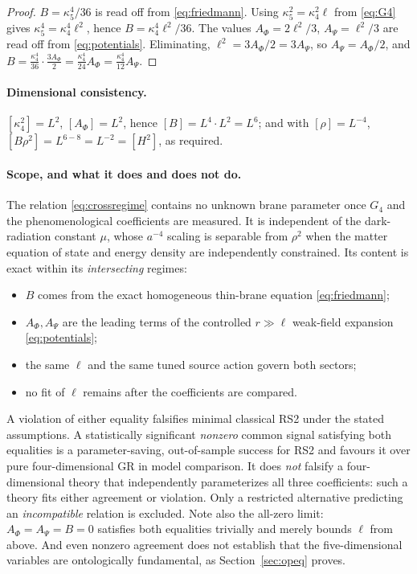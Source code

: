 \documentclass[11pt,a4paper]{article}
\theoremstyle{plain}
\theoremstyle{definition}
\newcommand{\kfive}{\kappa_5}
\newcommand{\kfour}{\kappa_4}
\begin{document}
\begin{proof}
$B=\kfive^4/36$ is read off from \eqref{eq:friedmann}. Using
$\kfive^2=\kfour^2\ell$ from \eqref{eq:G4} gives
$\kfive^4=\kfour^4\ell^2$, hence $B=\kfour^4\ell^2/36$. The values
$A_\Phi=2\ell^2/3$, $A_\Psi=\ell^2/3$ are read off from
\eqref{eq:potentials}. Eliminating, $\ell^2=3A_\Phi/2=3A_\Psi$, so
$A_\Psi=A_\Phi/2$, and
$B=\tfrac{\kfour^4}{36}\cdot\tfrac{3A_\Phi}{2}
=\tfrac{\kfour^4}{24}A_\Phi
=\tfrac{\kfour^4}{12}A_\Psi$.
\end{proof}

\paragraph{Dimensional consistency.}
$[\kfour^2]=L^2$, $[A_\Phi]=L^2$, hence $[B]=L^4\cdot L^2=L^6$; and with
$[\rho]=L^{-4}$, $[B\rho^2]=L^{6-8}=L^{-2}=[H^2]$, as required.

\paragraph{Scope, and what it does and does not do.}
The relation \eqref{eq:crossregime} contains no unknown brane parameter
once $G_4$ and the phenomenological coefficients are measured. It is
independent of the dark-radiation constant $\mu$, whose $a^{-4}$ scaling
is separable from $\rho^2$ when the matter equation of state and energy
density are independently constrained. Its content is exact within its
\emph{intersecting} regimes:
\begin{itemize}[leftmargin=*]
\item $B$ comes from the exact homogeneous thin-brane equation
\eqref{eq:friedmann};
\item $A_\Phi,A_\Psi$ are the leading terms of the controlled
$r\gg\ell$ weak-field expansion \eqref{eq:potentials};
\item the same $\ell$ and the same tuned source action govern both
sectors;
\item no fit of $\ell$ remains after the coefficients are compared.
\end{itemize}

A violation of either equality falsifies minimal classical RS2 under the
stated assumptions. A statistically significant \emph{nonzero} common
signal satisfying both equalities is a parameter-saving, out-of-sample
success for RS2 and favours it over pure four-dimensional GR in model
comparison. It does \emph{not} falsify a four-dimensional theory that
independently parameterizes all three coefficients: such a theory fits
either agreement or violation. Only a restricted alternative predicting
an \emph{incompatible} relation is excluded. Note also the all-zero limit:
$A_\Phi=A_\Psi=B=0$ satisfies both equalities trivially and merely bounds
$\ell$ from above. And even nonzero agreement does not establish that the
five-dimensional variables are ontologically fundamental, as
Section~\ref{sec:opeq} proves.
\end{document}
